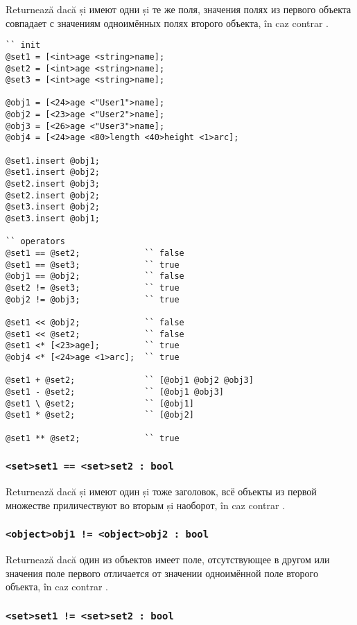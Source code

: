 Returnează \true{} dacă  și  имеют одни și те же поля, значения полях из первого объекта совпадает с значениям одноимённых полях второго объекта, în caz contrar \false{}.

\begin{lstlisting}[caption=Exemple de folosire al operatorilor asupra tipului object și set, label=setobjopex]
`` init
@set1 = [<int>age <string>name];
@set2 = [<int>age <string>name];
@set3 = [<int>age <string>name];

@obj1 = [<24>age <"User1">name];
@obj2 = [<23>age <"User2">name];
@obj3 = [<26>age <"User3">name];
@obj4 = [<24>age <80>length <40>height <1>arc];

@set1.insert @obj1;
@set1.insert @obj2;
@set2.insert @obj3;
@set2.insert @obj2;
@set3.insert @obj2;
@set3.insert @obj1;

`` operators
@set1 == @set2;				`` false
@set1 == @set3;				`` true
@obj1 == @obj2;				`` false
@set2 != @set3;				`` true
@obj2 != @obj3;				`` true

@set1 << @obj2;				`` false
@set1 << @set2;				`` false
@set1 <* [<23>age];			`` true
@obj4 <* [<24>age <1>arc];	`` true

@set1 + @set2;				`` [@obj1 @obj2 @obj3]
@set1 - @set2;				`` [@obj1 @obj3]
@set1 \ @set2;				`` [@obj1]
@set1 * @set2;				`` [@obj2]

@set1 ** @set2;				`` true
\end{lstlisting}

\subsubsection{\lstinline`<set>set1 == <set>set2 : bool`}

Returnează \true{} dacă  și  имеют один și тоже заголовок, всё объекты из первой множестве приличествуют во вторым și наоборот, în caz contrar \false{}.

\subsubsection{\lstinline`<object>obj1 != <object>obj2 : bool`}

Returnează \true{} dacă один из объектов имеет поле, отсутствующее в другом или значения поле первого отличается от значении одноимённой поле второго объекта, în caz contrar \false{}.

\subsubsection{\lstinline`<set>set1 != <set>set2 : bool`}

